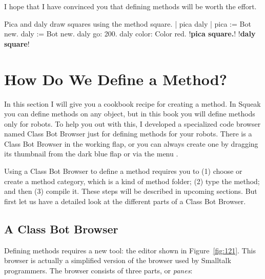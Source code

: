 \documentclass[a4paper,10pt,twoside]{book}
\begin{document}
I hope that I have convinced you that defining methods will be worth the effort. 

\begin{script}[123]{Pica and daly draw squares using the method square.}
| pica daly | 
pica := Bot new. 
daly := Bot new. 
daly go: 200. 
daly color: Color red. 
!\textbf{pica square.}!
!\textbf{daly square}!
\end{script}


\section{How Do We Define a Method?} 

In this section I will give you a cookbook recipe for creating a method. In Squeak you can 
define methods on any object, but in this book you will define methods only for robots. To 
help you out with this, I developed a specialized code browser named Class Bot Browser just 
for defining methods for your robots. There is a Class Bot Browser in the working flap, or you 
can always create one by dragging its thumbnail from the dark blue flap or via the menu 
.
 
Using a Class Bot Browser to define a method requires you to (1) choose or create a 
method category, which is a kind of method folder; (2) type the method; and then (3) compile 
it. These steps will be described in upcoming sections. But first let us have a detailed look at 
the different parts of a Class Bot Browser. 

\subsection{A Class Bot Browser} 

Defining methods requires a new tool: the editor shown in Figure~\ref{fig:121}. This browser is actually a simplified version of the browser used by Smalltalk programmers. The browser consists of three parts, or \emph{panes}: 
\end{document}

